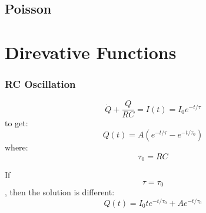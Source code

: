 \subsection{Poisson}

\section{Direvative Functions}

\subsubsection{RC Oscillation}
\begin{equation}
    \dot{Q} + \frac{Q}{RC} = I(t) = I_0e^{-t/\tau}
\end{equation}
to get:
\begin{equation}
    Q(t) = A (e^{-t/\tau} - e^{-t/\tau_0})
\end{equation}
where: $$ \tau_0 = RC $$ 

If $$ \tau = \tau_0 $$, then the solution is different:
\begin{equation}
    Q(t) = I_0 te^{-t/\tau_0} + Ae^{-t/\tau_0}
\end{equation}
